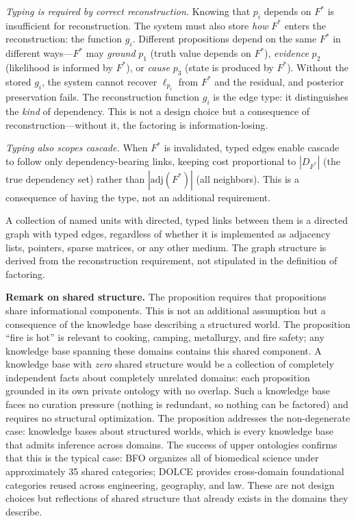 \documentclass[11pt]{article}
\theoremstyle{definition}
\begin{document}
\emph{Typing is required by correct reconstruction.}
Knowing that $p_i$ depends on $F^*$ is insufficient for
reconstruction. The system must also store \emph{how} $F^*$ enters
the reconstruction: the function $g_i$. Different propositions
depend on the same $F^*$ in different ways---$F^*$ may \emph{ground}
$p_1$ (truth value depends on $F^*$), \emph{evidence} $p_2$
(likelihood is informed by $F^*$), or \emph{cause} $p_3$ (state is
produced by $F^*$). Without the stored $g_i$, the system cannot
recover $\ell_{p_i}$ from $F^*$ and the residual, and posterior
preservation fails. The reconstruction function $g_i$ is the edge
type: it distinguishes the \emph{kind} of dependency. This is not a
design choice but a consequence of reconstruction---without it, the factoring is
information-losing.

\emph{Typing also scopes cascade.} When $F^*$ is invalidated,
typed edges enable cascade to follow only dependency-bearing
links, keeping cost proportional to $|D_{F^*}|$ (the true dependency
set) rather than $|\mathrm{adj}(F^*)|$ (all neighbors). This is a
consequence of having the type, not an additional requirement.

A collection of named units with directed, typed links between them
is a directed graph with typed edges, regardless of whether it is
implemented as adjacency lists, pointers, sparse matrices, or any other
medium. The graph structure is derived from the reconstruction
requirement, not stipulated in the definition of factoring.

\textbf{Remark on shared structure.} The proposition requires that
propositions share informational components. This is not an additional
assumption but a consequence of the knowledge base describing a
structured world. The proposition ``fire is hot'' is relevant to
cooking, camping, metallurgy, and fire safety; any knowledge base
spanning these domains contains this shared component. A knowledge base
with \emph{zero} shared structure would be a collection of completely
independent facts about completely unrelated domains: each proposition
grounded in its own private ontology with no overlap. Such a knowledge
base faces no curation pressure (nothing is redundant, so nothing can
be factored) and requires no structural optimization. The proposition
addresses the non-degenerate case: knowledge bases about structured
worlds, which is every knowledge base that admits inference across
domains. The success of upper ontologies confirms that this is the
typical case: BFO \cite{Arp2015} organizes all of biomedical science
under approximately 35 shared categories; DOLCE \cite{Masolo2003}
provides cross-domain foundational categories reused across engineering,
geography, and law. These are not design choices but reflections of
shared structure that already exists in the domains they describe.
\end{document}
